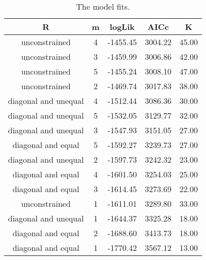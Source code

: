 \begin{table}[htp]
\begin{center}
\caption{The model fits.}
\label{ref:tablefits}
\begin{tabular}{ccccc}
  \hline
R & m & logLik & AICc & K \\ 
  \hline
unconstrained &   4 & -1455.45 & 3004.22 & 45.00 \\ 
  unconstrained &   3 & -1459.99 & 3006.86 & 42.00 \\ 
  unconstrained &   5 & -1455.24 & 3008.10 & 47.00 \\ 
  unconstrained &   2 & -1469.74 & 3017.83 & 38.00 \\ 
  diagonal and unequal &   4 & -1512.44 & 3086.36 & 30.00 \\ 
  diagonal and unequal &   5 & -1532.05 & 3129.77 & 32.00 \\ 
  diagonal and unequal &   3 & -1547.93 & 3151.05 & 27.00 \\ 
  diagonal and equal &   5 & -1592.27 & 3239.73 & 27.00 \\ 
  diagonal and unequal &   2 & -1597.73 & 3242.32 & 23.00 \\ 
  diagonal and equal &   4 & -1601.50 & 3254.03 & 25.00 \\ 
  diagonal and equal &   3 & -1614.45 & 3273.69 & 22.00 \\ 
  unconstrained &   1 & -1611.01 & 3289.80 & 33.00 \\ 
  diagonal and unequal &   1 & -1644.37 & 3325.28 & 18.00 \\ 
  diagonal and equal &   2 & -1688.60 & 3413.73 & 18.00 \\ 
  diagonal and equal &   1 & -1770.42 & 3567.12 & 13.00 \\ 
   \hline
\end{tabular}
\end{center}
\end{table}

